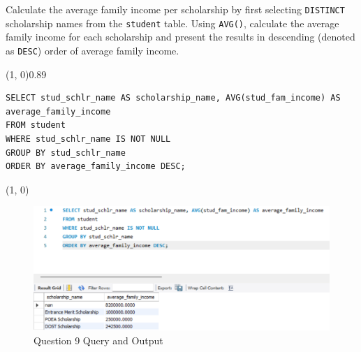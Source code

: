 
Calculate the average family income per scholarship by first selecting \texttt{DISTINCT} scholarship names from the \texttt{student} table. Using \texttt{AVG()}, calculate the average family income for each scholarship and present the results in descending (denoted as \texttt{DESC}) order of average family income.
\vspace{\baselineskip}

\sol{}
\noindent\line(1, 0){0.89\linewidth}
\begin{verbatim}
SELECT stud_schlr_name AS scholarship_name, AVG(stud_fam_income) AS average_family_income
FROM student
WHERE stud_schlr_name IS NOT NULL
GROUP BY stud_schlr_name
ORDER BY average_family_income DESC;
\end{verbatim}
\noindent\line(1, 0){\linewidth}

\begin{figure}[H]
    \centering
    \includegraphics[width=0.7\linewidth]{images/q9.png}
    \caption{Question 9 Query and Output}
\end{figure}

